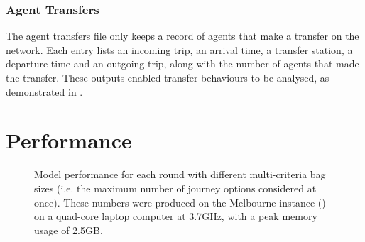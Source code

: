 \subsubsection{Agent Transfers} 
The agent transfers file only keeps a record of agents that make a transfer on the network. Each entry lists an incoming trip, an arrival time, a transfer station, a departure time and an outgoing trip, along with the number of agents that made the transfer. These outputs enabled transfer behaviours to be analysed, as demonstrated in . 

\section{Performance}
\label{sec:Performance}

\begin{figure}[ht]
    \centering
    \caption[Graph of model performance]{Model performance for each round with different multi-criteria bag sizes (i.e. the maximum number of journey options considered at once). These numbers were produced on the Melbourne instance () on a quad-core laptop computer at 3.7GHz, with a peak memory usage of 2.5GB.}
    \label{fig:ModelPerformance}
\end{figure}

